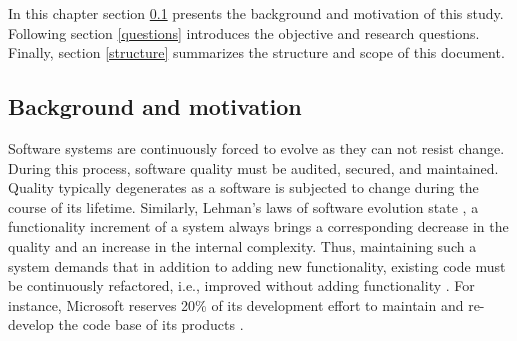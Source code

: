 In this chapter section \ref{background} presents the background and motivation of this study. Following section \ref{questions} introduces the objective and research questions. Finally, section \ref{structure} summarizes the structure and scope of this document. 
\subsection{Background and motivation} \label{background}






Software systems are continuously forced to evolve as they can not resist change. During this process, software quality must be audited, secured, and maintained. Quality typically degenerates as a software is subjected to change during the course of its lifetime. Similarly, Lehman’s laws of software evolution state \cite{lehmanLaws}, a functionality increment of a system always brings a corresponding decrease in the quality and an increase in the internal complexity. Thus, maintaining such a system demands that in addition to adding new functionality, existing code must be continuously refactored, i.e., improved without adding functionality \cite{mantylaTaxonomy}. For instance, Microsoft reserves 20\% of its development effort to maintain and re-develop the code base of its products \cite{selbyMicrosoft}. 

